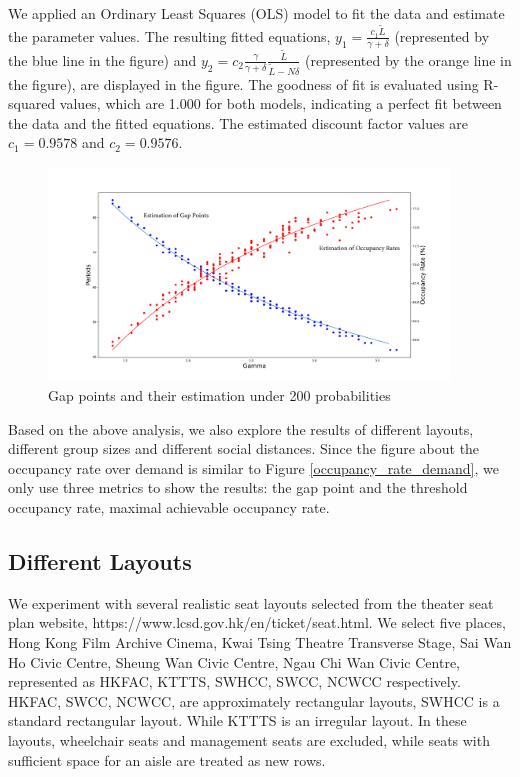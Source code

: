 We applied an Ordinary Least Squares (OLS) model to fit the data and estimate the parameter values. The resulting fitted equations, $y_1 = \frac{c_1 \tilde{L}}{\gamma + \delta}$ (represented by the blue line in the figure) and $y_2 = c_2 \frac{\gamma}{\gamma + \delta} \frac{\tilde{L}}{\tilde{L}-N \delta}$ (represented by the orange line in the figure), are displayed in the figure. The goodness of fit is evaluated using R-squared values, which are 1.000 for both models, indicating a perfect fit between the data and the fitted equations. The estimated discount factor values are $c_1 = 0.9578$ and $c_2 = 0.9576$.

\begin{figure}[ht]
  \centering
    \includegraphics[width=0.95\textwidth]{./Figures/esti_scatter.pdf}
  \caption{Gap points and their estimation under 200 probabilities}
\end{figure}


Based on the above analysis, we also explore the results of different layouts, different group sizes and different social distances. Since the figure about the occupancy rate over demand is similar to Figure \ref{occupancy_rate_demand}, we only use three metrics to show the results: the gap point and the threshold occupancy rate, maximal achievable occupancy rate.

\subsection*{Different Layouts}
We experiment with several realistic seat layouts selected from the theater seat plan website, https://www.lcsd.gov.hk/en/ticket/seat.html. We select five places, Hong Kong Film Archive Cinema, Kwai Tsing Theatre Transverse Stage, Sai Wan Ho Civic Centre, Sheung Wan Civic Centre, Ngau Chi Wan Civic Centre, represented as HKFAC, KTTTS, SWHCC, SWCC, NCWCC respectively. HKFAC, SWCC, NCWCC, are approximately rectangular layouts, SWHCC is a standard rectangular layout. While KTTTS is an irregular layout. In these layouts, wheelchair seats and management seats are excluded, while seats with sufficient space for an aisle are treated as new rows.

